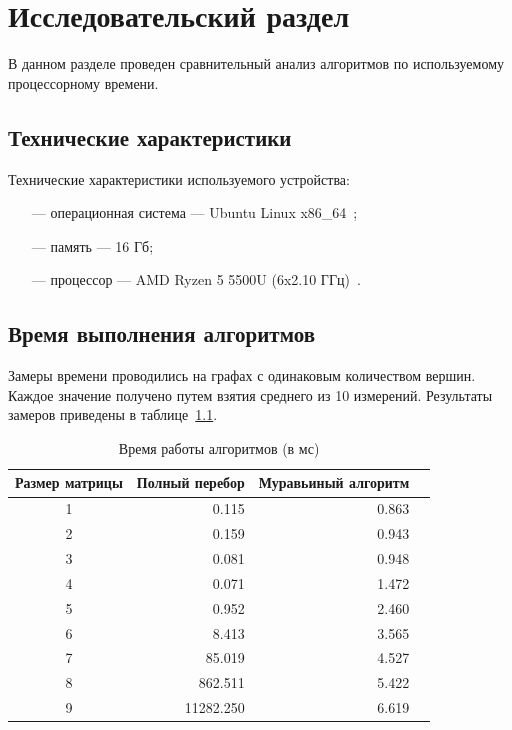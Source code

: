 \chapter{Исследовательский раздел}
В данном разделе проведен сравнительный анализ алгоритмов по используемому процессорному времени.

\section{Технические характеристики}
Технические характеристики используемого устройства:
\begin{itemize}
    \item[---] операционная система --- Ubuntu Linux x86\_64~\cite{Ubuntu};
    \item[---] память --- 16 Гб;
    \item[---] процессор --- AMD Ryzen 5 5500U (6x2.10 ГГц)~\cite{AMD}.
\end{itemize}


\section{Время выполнения алгоритмов}
Замеры времени проводились на графах с одинаковым количеством вершин. Каждое значение получено путем взятия среднего из 10 измерений. Результаты замеров приведены в таблице~\ref{tbl:time_measurements}.

\begin{table}[h]
	\begin{center}
		\begin{threeparttable}
		\captionsetup{justification=raggedright,singlelinecheck=off}
		\caption{Время работы алгоритмов (в мс)}
		\label{tbl:time_measurements}
		\begin{tabular}{|c|r|r|r|}
			\hline
			Размер матрицы & Полный перебор & Муравьиный алгоритм \\
            \hline
			1    & 0.115 & 0.863 \\
            \hline
			2    & 0.159 & 0.943 \\ 
            \hline
			3    & 0.081 & 0.948 \\ 
            \hline
			4    & 0.071 & 1.472 \\ 
			\hline
			5    & 0.952 & 2.460 \\ 
			\hline
			6    & 8.413 & 3.565 \\ 
			\hline
			7    & 85.019 & 4.527 \\ 
			\hline
			8    & 862.511 & 5.422 \\ 
			\hline
			9    & 11282.250 & 6.619 \\ 
            \hline
		\end{tabular}
		\end{threeparttable}
    \end{center}
\end{table}

